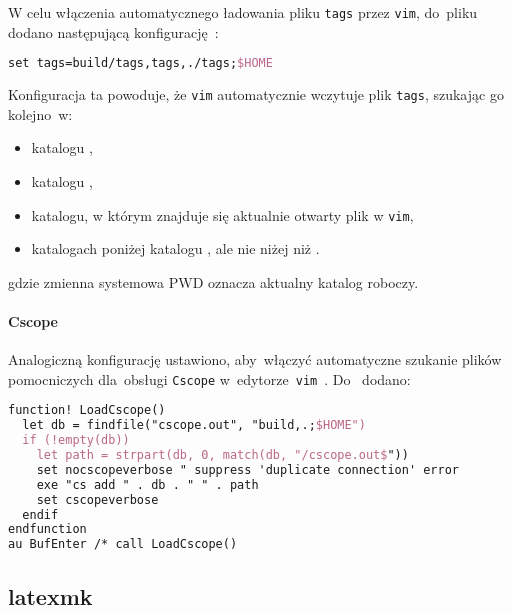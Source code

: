 \documentclass[thesis]{subfiles}
\begin{document}
W celu włączenia automatycznego ładowania pliku \texttt{tags} przez \texttt{vim}, do~pliku \mbox{} dodano następującą konfigurację~\cite{ctags,ctags-tricks}:
\begin{lstlisting}[language=tex,numbers=none,caption={Konfiguracja \texttt{ctags} w~\texttt{.vimrc}}]
set tags=build/tags,tags,./tags;$HOME
\end{lstlisting}
Konfiguracja ta powoduje, że \texttt{vim} automatycznie wczytuje plik \texttt{tags}, szukając go kolejno~w:
\begin{itemize}[font=\ttfamily]
	\item katalogu ,
	\item katalogu ,
	\item katalogu, w którym znajduje się aktualnie otwarty plik w \texttt{vim},
	\item katalogach poniżej katalogu , ale nie niżej niż .
\end{itemize}
gdzie zmienna systemowa \gls{PWD} oznacza aktualny katalog roboczy.

\paragraph{Cscope}

Analogiczną konfigurację ustawiono, aby~włączyć automatyczne szukanie plików pomocniczych dla~obsługi \texttt{Cscope} w~edytorze~\texttt{vim}~\cite{cscope,cscope-autoload}. Do~ dodano:
\begin{lstlisting}[language=tex,numbers=none,caption={Konfiguracja \texttt{Cscope} w~\texttt{.vimrc}}]
function! LoadCscope()
  let db = findfile("cscope.out", "build,.;$HOME")
  if (!empty(db))
    let path = strpart(db, 0, match(db, "/cscope.out$"))
    set nocscopeverbose " suppress 'duplicate connection' error
    exe "cs add " . db . " " . path
    set cscopeverbose
  endif
endfunction
au BufEnter /* call LoadCscope()
\end{lstlisting}


\subsection{latexmk}
\end{document}
